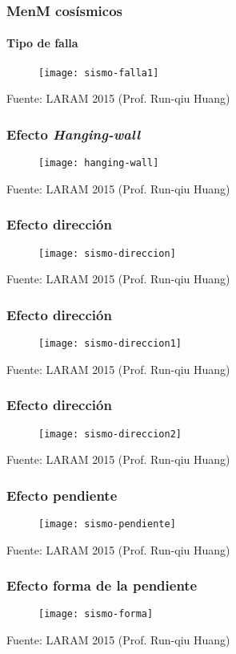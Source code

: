 \documentclass[12pt]{beamer}
\begin{document}
\begin{frame}
\frametitle{MenM cosísmicos}
\framesubtitle{Tipo de falla}
\begin{figure}
\centering
\texttt{[image: sismo-falla1]} 
\end{figure}
\tiny{Fuente: LARAM 2015 (Prof. Run-qiu Huang) }
\end{frame}
\begin{frame}
\frametitle{Efecto \emph{Hanging-wall}}
\begin{figure}
\centering
\texttt{[image: hanging-wall]} 
\end{figure}
\tiny{Fuente: LARAM 2015 (Prof. Run-qiu Huang) }
\end{frame}
\begin{frame}
\frametitle{Efecto dirección}
\begin{figure}
\centering
\texttt{[image: sismo-direccion]} 
\end{figure}
\tiny{Fuente: LARAM 2015 (Prof. Run-qiu Huang) }
\end{frame}
\begin{frame}
\frametitle{Efecto dirección}
\begin{figure}
\centering
\texttt{[image: sismo-direccion1]} 
\end{figure}
\tiny{Fuente: LARAM 2015 (Prof. Run-qiu Huang) }
\end{frame}
\begin{frame}
\frametitle{Efecto dirección}
\begin{figure}
\centering
\texttt{[image: sismo-direccion2]} 
\end{figure}
\tiny{Fuente: LARAM 2015 (Prof. Run-qiu Huang) }
\end{frame}
\begin{frame}
\frametitle{Efecto pendiente}
\begin{figure}
\centering
\texttt{[image: sismo-pendiente]} 
\end{figure}
\tiny{Fuente: LARAM 2015 (Prof. Run-qiu Huang) }
\end{frame}
\begin{frame}
\frametitle{Efecto forma de la pendiente}
\begin{figure}
\centering
\texttt{[image: sismo-forma]} 
\end{figure}
\tiny{Fuente: LARAM 2015 (Prof. Run-qiu Huang) }
\end{frame}
\end{document}

